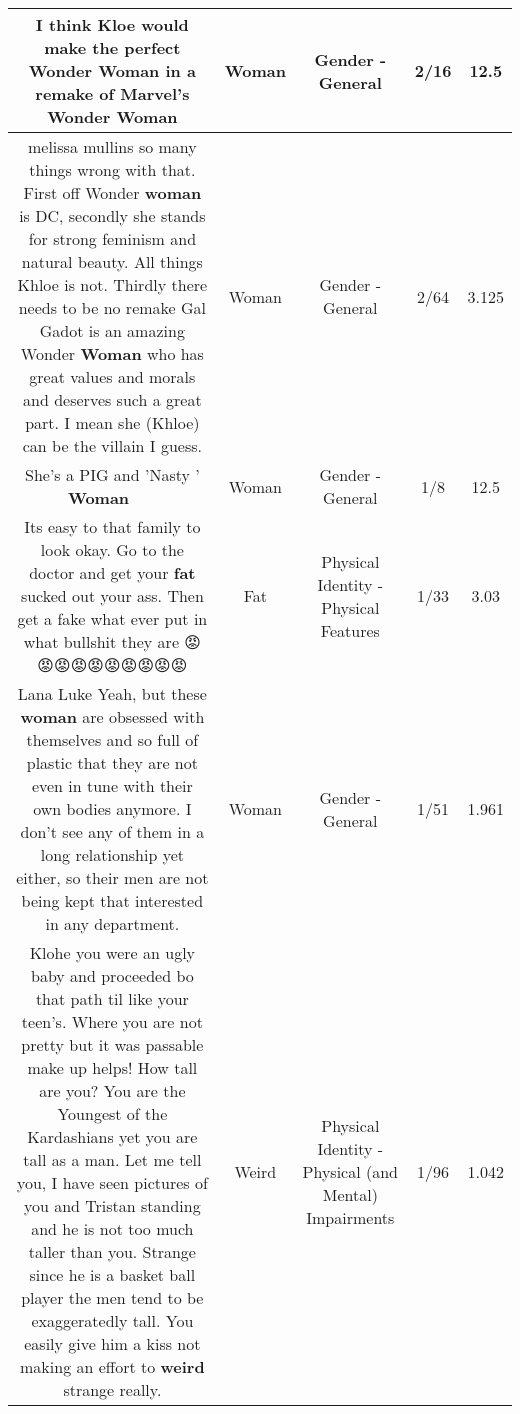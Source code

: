 \documentclass[11pt]{article}
\newlength\mylength
\begin{document}
\begin{center}
\begin{longtable}{|C{.65\mylength}|C{.30\mylength}|C{.12\mylength}|C{.12\mylength}|C{.12\mylength}|}
  \small I think Kloe would make the perfect Wonder \textbf{Woman} in a remake of Marvel's Wonder Woman\normalsize   & Woman & Gender - General & 2/16 & 12.5 \\  \hline
  \small melissa mullins so many things wrong with that. First off Wonder \textbf{woman} is DC, secondly she stands for strong feminism and natural beauty. All things Khloe is not. Thirdly there needs to be no remake Gal Gadot is an amazing Wonder \textbf{Woman} who has great values and morals and deserves such a great part. I mean she (Khloe) can be the villain I guess.\normalsize   & Woman & Gender - General & 2/64 & 3.125 \\  \hline
  \small She's a PIG and 'Nasty ' \textbf{Woman} 🐷🐽🐖🐖🐖\normalsize   & Woman & Gender - General & 1/8 & 12.5 \\  \hline
  \small Its easy to that family to look okay. Go to the doctor and get your \textbf{fat} sucked out your ass. Then get a fake what ever put in what bullshit they are 😡😡😡😡😡😡😡😡😡😡\normalsize   & Fat & Physical Identity - Physical Features & 1/33 & 3.03 \\  \hline
  \small Lana Luke   Yeah, but these  \textbf{woman} are obsessed with themselves and so full of plastic that they are not even in tune with their own bodies anymore.  I don't see any of them in a long relationship yet either,  so their men are not being kept that interested in any department.\normalsize   & Woman & Gender - General & 1/51 & 1.961 \\  \hline
  \small Klohe you were an ugly baby and proceeded bo that path til like your teen's.  Where you are not pretty but it was passable make up helps!  How tall are you?  You are the Youngest of the Kardashians  yet you are tall as a man. Let me tell you, I  have seen pictures of you and  Tristan  standing and he is not too much taller than you. Strange  since he is a basket  ball player the men tend to be exaggeratedly  tall. You easily give him a kiss not making an effort to \textbf{weird} strange really.\normalsize   & Weird & Physical Identity - Physical (and Mental) Impairments & 1/96 & 1.042 \\  \hline

\end{longtable}
\end{center}
\end{document}
